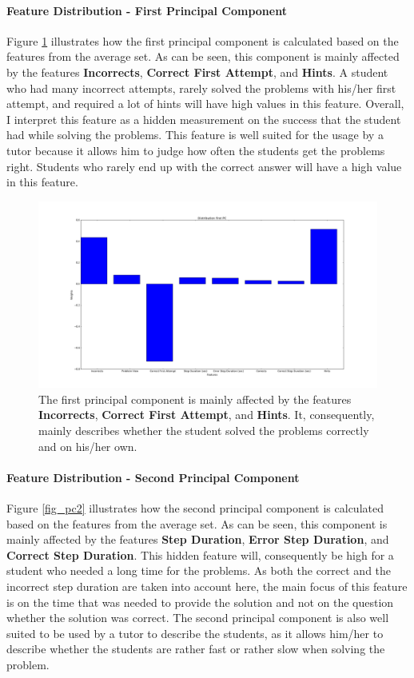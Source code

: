 \paragraph{Feature Distribution - First Principal Component}
Figure \ref{fig_pc1} illustrates how the first principal component is calculated based on the features from the average set. As can be seen, this component is mainly affected by the features \textbf{Incorrects}, \textbf{Correct First Attempt}, and \textbf{Hints}. A student who had many incorrect attempts, rarely solved the problems with his/her first attempt, and required a lot of hints will have high values in this feature. Overall, I interpret this feature as a hidden measurement on the success that the student had while solving the problems. This feature is well suited for the usage by a tutor because it allows him to judge how often the students get the problems right. Students who rarely end up with the correct answer will have a high value in this feature.

  \begin{figure}
  	\centering
  	\includegraphics[width=\textwidth]{./img/pc1.png}
  	\caption{The first principal component is mainly affected by the features \textbf{Incorrects}, \textbf{Correct First Attempt}, and \textbf{Hints}. It, consequently, mainly describes whether the student solved the problems correctly and on his/her own.\label{fig_pc1}}
  \end{figure}
  
\paragraph{Feature Distribution - Second Principal Component}
Figure \ref{fig_pc2} illustrates how the second principal component is calculated based on the features from the average set. As can be seen, this component is mainly affected by the features \textbf{Step Duration}, \textbf{Error Step Duration}, and \textbf{Correct Step Duration}. This hidden feature will, consequently be high for a student who needed a long time for the problems. As both the correct and the incorrect step duration are taken into account here, the main focus of this feature is on the time that was needed to provide the solution and not on the question whether the solution was correct. The second principal component is also well suited to be used by a tutor to describe the students, as it allows him/her to describe whether the students are rather fast or rather slow when solving the problem. 

